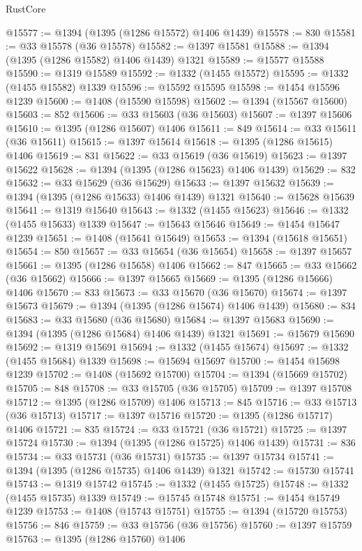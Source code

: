 \begin{lexlean}{RustCore}
\begin{coremodule}
@15577 := @1394 (@1395 (@1286 @15572) @1406 @1439)
@15578 := 830
@15581 := @33 @15578 (@36 @15578)
@15582 := @1397 @15581
@15588 := @1394 (@1395 (@1286 @15582) @1406 @1439) @1321
@15589 := @15577 @15588
@15590 := @1319 @15589
@15592 := @1332 (@1455 @15572)
@15595 := @1332 (@1455 @15582) @1339
@15596 := @15592 @15595
@15598 := @1454 @15596 @1239
@15600 := @1408 (@15590 @15598)
@15602 := @1394 (@15567 @15600)
@15603 := 852
@15606 := @33 @15603 (@36 @15603)
@15607 := @1397 @15606
@15610 := @1395 (@1286 @15607) @1406
@15611 := 849
@15614 := @33 @15611 (@36 @15611)
@15615 := @1397 @15614
@15618 := @1395 (@1286 @15615) @1406
@15619 := 831
@15622 := @33 @15619 (@36 @15619)
@15623 := @1397 @15622
@15628 := @1394 (@1395 (@1286 @15623) @1406 @1439)
@15629 := 832
@15632 := @33 @15629 (@36 @15629)
@15633 := @1397 @15632
@15639 := @1394 (@1395 (@1286 @15633) @1406 @1439) @1321
@15640 := @15628 @15639
@15641 := @1319 @15640
@15643 := @1332 (@1455 @15623)
@15646 := @1332 (@1455 @15633) @1339
@15647 := @15643 @15646
@15649 := @1454 @15647 @1239
@15651 := @1408 (@15641 @15649)
@15653 := @1394 (@15618 @15651)
@15654 := 850
@15657 := @33 @15654 (@36 @15654)
@15658 := @1397 @15657
@15661 := @1395 (@1286 @15658) @1406
@15662 := 847
@15665 := @33 @15662 (@36 @15662)
@15666 := @1397 @15665
@15669 := @1395 (@1286 @15666) @1406
@15670 := 833
@15673 := @33 @15670 (@36 @15670)
@15674 := @1397 @15673
@15679 := @1394 (@1395 (@1286 @15674) @1406 @1439)
@15680 := 834
@15683 := @33 @15680 (@36 @15680)
@15684 := @1397 @15683
@15690 := @1394 (@1395 (@1286 @15684) @1406 @1439) @1321
@15691 := @15679 @15690
@15692 := @1319 @15691
@15694 := @1332 (@1455 @15674)
@15697 := @1332 (@1455 @15684) @1339
@15698 := @15694 @15697
@15700 := @1454 @15698 @1239
@15702 := @1408 (@15692 @15700)
@15704 := @1394 (@15669 @15702)
@15705 := 848
@15708 := @33 @15705 (@36 @15705)
@15709 := @1397 @15708
@15712 := @1395 (@1286 @15709) @1406
@15713 := 845
@15716 := @33 @15713 (@36 @15713)
@15717 := @1397 @15716
@15720 := @1395 (@1286 @15717) @1406
@15721 := 835
@15724 := @33 @15721 (@36 @15721)
@15725 := @1397 @15724
@15730 := @1394 (@1395 (@1286 @15725) @1406 @1439)
@15731 := 836
@15734 := @33 @15731 (@36 @15731)
@15735 := @1397 @15734
@15741 := @1394 (@1395 (@1286 @15735) @1406 @1439) @1321
@15742 := @15730 @15741
@15743 := @1319 @15742
@15745 := @1332 (@1455 @15725)
@15748 := @1332 (@1455 @15735) @1339
@15749 := @15745 @15748
@15751 := @1454 @15749 @1239
@15753 := @1408 (@15743 @15751)
@15755 := @1394 (@15720 @15753)
@15756 := 846
@15759 := @33 @15756 (@36 @15756)
@15760 := @1397 @15759
@15763 := @1395 (@1286 @15760) @1406

\end{coremodule}
\end{lexlean}
